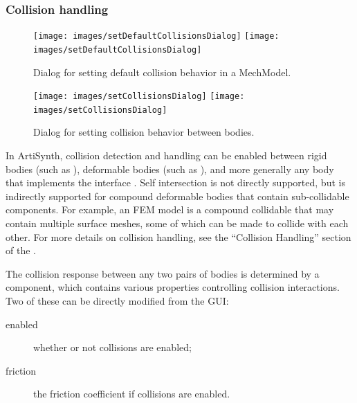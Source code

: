 \documentclass{article}
\begin{document}
\subsubsection{Collision handling}

\begin{figure}[h]
\begin{center}
\iflatexml
\texttt{[image: images/setDefaultCollisionsDialog]}
\else
\texttt{[image: images/setDefaultCollisionsDialog]}
\fi
\end{center}
\caption{Dialog for setting default collision behavior in a MechModel.}%
\label{setDefaultCollisionsDialogFig}
\end{figure}

\begin{figure}[h]
\begin{center}
\iflatexml
\texttt{[image: images/setCollisionsDialog]}
\else
\texttt{[image: images/setCollisionsDialog]}
\fi
\end{center}
\caption{Dialog for setting collision behavior between bodies.}%
\label{setCollisionsDialogFig}
\end{figure}

In ArtiSynth, collision detection and handling can be enabled between
rigid bodies (such as
), deformable bodies
(such as ), and more
generally any body that implements the interface
.  Self intersection
is not directly supported, but is indirectly supported for compound
deformable bodies that contain sub-collidable components. For example,
an FEM model is a compound collidable that may contain multiple
surface meshes, some of which can be made to collide with each other.
For more details on collision handling, see the ``Collision Handling''
section of the
.

The collision response between any two pairs of bodies is determined
by a 
component, which contains various properties controlling collision
interactions. Two of these can be directly modified from the GUI:

\begin{description}

\item[enabled]\mbox{}

whether or not collisions are enabled;

\item[friction]\mbox{}

the friction coefficient if collisions are enabled.	

\end{description}
\end{document}
